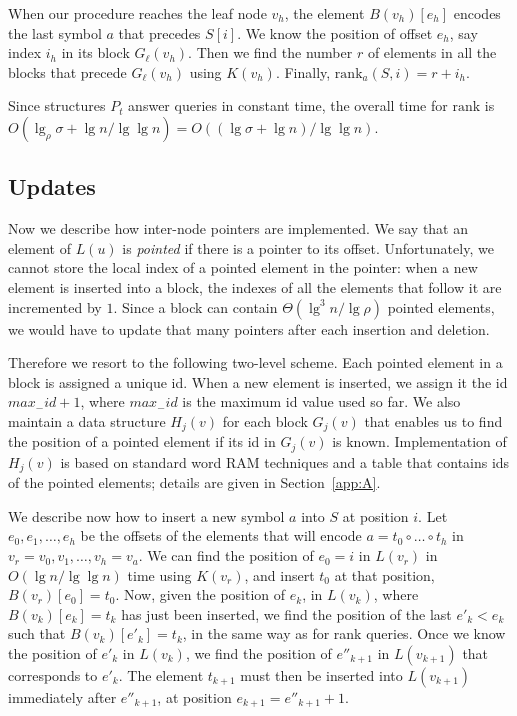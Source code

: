 \documentclass[11pt]{article}
\def\idrm#1{\ensuremath{\mathrm{#1}}}
\newcommand{\cP}{{ K}}
\newcommand{\ra}{\idrm{rank}}
\begin{document}
When our procedure reaches the leaf node $v_h$, the element $B(v_h)[e_h]$ encodes the last 
symbol $a$ that precedes $S[i]$. We know the position of offset $e_h$, say
index $i_h$ in its block $G_\ell(v_h)$. Then we find the number $r$ of 
elements in all the blocks that precede $G_\ell(v_h)$ using $\cP(v_h)$. 
Finally, $\ra_a(S,i)=r+i_h$.

Since structures $P_t$ answer queries in constant time, the overall time for
$\ra$ is $O(\lg_\rho\sigma+\lg n/\lg\lg n) = O((\lg\sigma + \lg n)/ \lg\lg n)$.


\subsection{Updates} \label{sec:H}

Now we describe how inter-node pointers are implemented.
We say that an element of $L(u)$ is \emph{pointed} if there 
is a pointer to its offset. 
Unfortunately, we cannot store the local index of a pointed 
element in the pointer: when a new element is inserted into 
a block, the indexes of all the elements that follow it are incremented 
by $1$. Since a block can contain $\Theta(\lg^3 n/\lg\rho)$ pointed 
elements, we would have to update that many
pointers after each insertion and deletion. 

Therefore we resort to the following two-level scheme. 
Each pointed element in a block is assigned a unique id. 
When a new element is inserted, we assign it the id 
$max_-id+1$, where $max_-id$ is the maximum 
id value used so far. 
We also maintain a data structure $H_j(v)$ for each block 
$G_j(v)$ that enables us to find the position 
of a pointed element if its id in $G_j(v)$ is known.
Implementation of $H_j(v)$ is based on standard 
word RAM techniques and a table that contains ids of the 
pointed elements; details are given in Section~\ref{app:A}.


We describe now how to insert a new symbol $a$ into $S$ at position $i$. 
Let $e_0,e_1,\ldots,e_h$ be the offsets of the elements that will encode 
$a = t_0 \circ \ldots \circ t_h$ in $v_r=v_0,v_1,\ldots,v_h=v_a$. 
We can find the position of $e_0=i$ in $L(v_r)$ in $O(\lg n/\lg \lg n)$ time
using $\cP(v_r)$, and insert $t_0$ at that position, $B(v_r)[e_0]=t_0$.
Now, given the position of $e_k$, in $L(v_k)$, where $B(v_k)[e_k]=t_k$ has
just been inserted,
we find the position of the last $e'_k<e_k$ such that 
$B(v_k)[e'_k]=t_k$, in the same way as  for rank queries.
Once we know the position of $e'_k$ in $L(v_k)$, we find 
the position of $e''_{k+1}$ in $L(v_{k+1})$ that corresponds to $e'_k$. 
The element $t_{k+1}$ must then be inserted into $L(v_{k+1})$ 
immediately after $e''_{k+1}$, at position $e_{k+1} = e''_{k+1}+1$.
\end{document}
